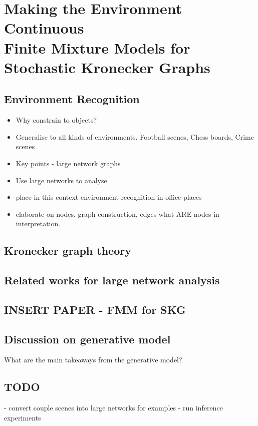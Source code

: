 \chapter{Making the Environment Continuous \\ {\Large Finite Mixture Models for Stochastic Kronecker Graphs}}
\label{chap:skgfmm}

\section{Environment Recognition}
\begin{itemize}
\item Why constrain to objects?
\item Generalise to all kinds of environments. Football scenes, Chess boards, Crime scenes
\item Key points - large network graphs
\item Use large networks to analyse
\item place in this context environment recognition in office places
\item elaborate on nodes, graph construction, edges what ARE nodes in interpretation.
\end{itemize}
\section{Kronecker graph theory}
\section{Related works for large network analysis}
\section{INSERT PAPER - FMM for SKG}
\section{Discussion on generative model}
What are the main takeaways from the generative model?
\section{TODO}
- convert couple scenes into large networks for examples
- run inference experiments

